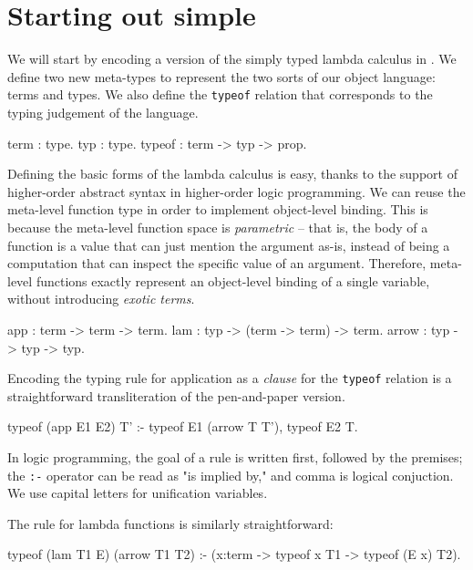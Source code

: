 \documentclass[format=acmlarge,review,anonymous]{acmart}\settopmatter{printfolios=true}
\begin{document}

\section{Starting out simple}

We will start by encoding a version of the simply typed lambda calculus in \lamprolog. We define two
new meta-types to represent the two sorts of our object language: terms and types. We also define
the \texttt{typeof} relation that corresponds to the typing judgement of the language.
\begin{codequote}
term   : type.
typ    : type.
typeof : term -> typ -> prop.
\end{codequote}

Defining the basic forms of the lambda calculus is easy, thanks to the support of higher-order
abstract syntax in higher-order logic programming. We can reuse the meta-level function type in
order to implement object-level binding. This is because the meta-level function space is
\textit{parametric} -- that is, the body of a function is a value that can just mention the argument
as-is, instead of being a computation that can inspect the specific value of an argument. Therefore,
meta-level functions exactly represent an object-level binding of a single variable, without
introducing \textit{exotic terms}.

\begin{codequote}
app    : term -> term -> term.
lam    : typ -> (term -> term) -> term.
arrow  : typ -> typ -> typ.
\end{codequote}

Encoding the typing rule for application as a \lamprolog \textit{clause} for the \texttt{typeof} relation is a
straightforward transliteration of the pen-and-paper version.

\begin{codequote}
typeof (app E1 E2) T' :-
  typeof E1 (arrow T T'),
  typeof E2 T.
\end{codequote}

In logic programming, the goal of a rule is written first, followed by the premises; the \texttt{:-}
operator can be read as "is implied by," and comma is logical conjuction. We use capital letters for
unification variables.

The rule for lambda functions is similarly straightforward: 

\begin{codequote}
typeof (lam T1 E) (arrow T1 T2) :-
  (x:term -> typeof x T1 -> typeof (E x) T2).
\end{codequote}
\end{document}
